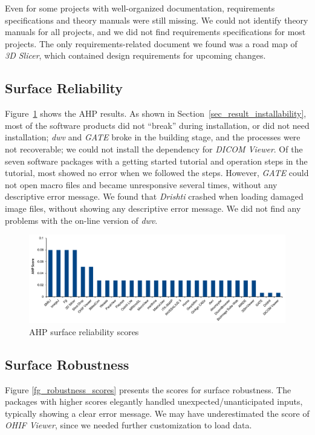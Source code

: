 \documentclass[11pt]{article}
\begin{document}
Even for some projects with well-organized documentation, requirements
specifications and theory manuals were still missing.  We could not identify
theory manuals for all projects, and we did not find requirements specifications
for most projects. The only requirements-related document we found was a road
map of \textit{3D Slicer}, which contained design requirements for upcoming
changes.

\subsection{Surface Reliability} \label{sec_result_reliability}

Figure~\ref{fg_reliability_scores} shows the AHP results.  As shown in
Section~\ref{sec_result_installability}, most of the software products did not
``break'' during installation, or did not need installation; \textit{dwv} and
\textit{GATE} broke in the building stage, and the processes were not
recoverable; we could not install the dependency for \textit{DICOM Viewer}. Of
the seven software packages with a getting started tutorial and operation steps
in the tutorial, most showed no error when we followed the steps. However,
\textit{GATE} could not open macro files and became unresponsive several times,
without any descriptive error message. We found that \textit{Drishti} crashed
when loading damaged image files, without showing any descriptive error message.
We did not find any problems with the on-line version of \textit{dwv}.

\begin{figure}[!ht]
\includegraphics[scale=0.47]{reliability_scores.pdf}
\caption{AHP surface reliability scores}
\label{fg_reliability_scores}
\end{figure}

\subsection{Surface Robustness} \label{sec_result_robustness}

Figure \ref{fg_robustness_scores} presents the scores for surface robustness.
The packages with higher scores elegantly handled unexpected/unanticipated
inputs, typically showing a clear error message. We may have underestimated the
score of \textit{OHIF Viewer}, since we needed further customization to load
data.
\end{document}
